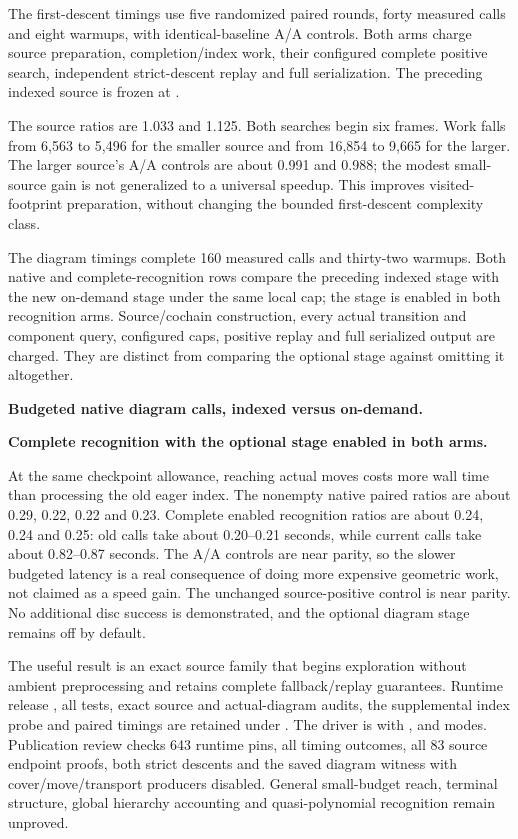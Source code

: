 The first-descent timings use five randomized paired rounds, forty measured
calls and eight warmups, with identical-baseline A/A controls. Both arms
charge source preparation, completion/index work, their configured complete
positive search, independent strict-descent replay and full serialization.
The preceding indexed source is frozen at .



The source ratios are 1.033 and 1.125. Both searches begin six frames. Work
falls from 6,563 to 5,496 for the smaller source and from 16,854 to 9,665
for the larger. The larger source's A/A controls are about 0.991 and 0.988;
the modest small-source gain is not generalized to a universal speedup.
This improves visited-footprint preparation, without changing the bounded
first-descent complexity class.

The diagram timings complete 160 measured calls and thirty-two warmups.
Both native and complete-recognition rows compare the preceding indexed
stage with the new on-demand stage under the same local cap; the stage is
enabled in both recognition arms. Source/cochain construction, every actual
transition and component query, configured caps, positive replay and full
serialized output are charged. They are distinct from comparing the optional
stage against omitting it altogether.

\textbf{Budgeted native diagram calls, indexed versus on-demand.}

\textbf{Complete recognition with the optional stage enabled in both arms.}


At the same checkpoint allowance, reaching actual moves costs more wall time
than processing the old eager index. The nonempty native paired ratios are
about 0.29, 0.22, 0.22 and 0.23. Complete enabled recognition ratios are
about 0.24, 0.24 and 0.25: old calls take about 0.20--0.21 seconds, while
current calls take about 0.82--0.87 seconds. The A/A controls are near parity,
so the slower budgeted latency is a real consequence of doing more expensive
geometric work, not claimed as a speed gain. The unchanged source-positive
control is near parity. No additional disc success is demonstrated, and
the optional diagram stage remains off by default.

The useful result is an exact source family that begins exploration without
ambient preprocessing and retains complete fallback/replay guarantees.
Runtime release , all tests, exact source and actual-diagram
audits, the supplemental index probe and paired timings are retained under
. The driver is
 with ,
 and  modes.
Publication review checks 643 runtime pins, all timing outcomes, all 83
source endpoint proofs, both strict descents and the saved diagram witness
with cover/move/transport producers disabled. General small-budget reach,
terminal structure, global hierarchy accounting and quasi-polynomial
recognition remain unproved.
